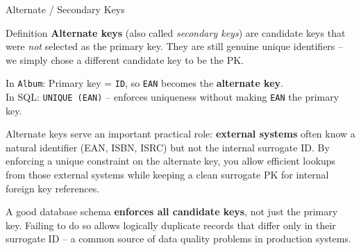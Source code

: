 \begin{frame}{Alternate / Secondary Keys}
  \begin{block}{Definition}
    \textbf{Alternate keys} (also called \emph{secondary keys}) are
    candidate keys that were \emph{not} selected as the primary key.
    They are still genuine unique identifiers -- we simply chose a
    different candidate key to be the PK.
  \end{block}

  \begin{examples}{}
    In \texttt{Album}: Primary key = \texttt{ID},
    so \texttt{EAN} becomes the \textbf{alternate key}.\\[4pt]
    In SQL: \quad \texttt{UNIQUE (EAN)} \quad -- enforces uniqueness without
    making \texttt{EAN} the primary key.
  \end{examples}

  Alternate keys serve an important practical role: \textbf{external systems}
  often know a natural identifier (EAN, ISBN, ISRC) but not the internal
  surrogate ID.  By enforcing a unique constraint on the alternate key, you
  allow efficient lookups from those external systems while keeping a
  clean surrogate PK for internal foreign key references.

  \medskip
  A good database schema \textbf{enforces all candidate keys}, not just
  the primary key.  Failing to do so allows logically duplicate records
  that differ only in their surrogate ID -- a common source of data
  quality problems in production systems.
\end{frame}

